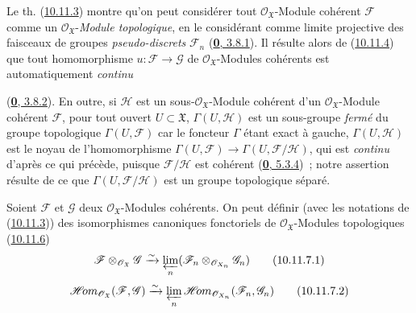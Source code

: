 \begin{env}[10.11.6]
\label{I.10.11.6-fr}
Le th. (\hyperref[I.10.11.3-fr]{10.11.3}) montre qu'on peut considérer
tout $\mathscr{O}_{\mathfrak{X}}$-Module cohérent $\mathscr{F}$ comme
un $\mathscr{O}_{\mathfrak{X}}$-\emph{Module topologique}, en le
considérant comme limite projective des faisceaux de groupes
\emph{pseudo-discrets} $\mathscr{F}_n$
(\hyperref[0.3.8.1-fr]{\textbf{0}, 3.8.1}). Il résulte alors de
(\hyperref[I.10.11.4-fr]{10.11.4}) que tout homomorphisme
$u:\mathscr{F}\to\mathscr{G}$ de
$\mathscr{O}_{\mathfrak{X}}$-Modules cohérents est automatiquement
\emph{continu}


(\hyperref[0.3.8.2-fr]{\textbf{0}, 3.8.2}). En outre, si $\mathscr{H}$ est un
sous-$\mathscr{O}_{\mathfrak{X}}$-Module cohérent d'un
$\mathscr{O}_{\mathfrak{X}}$-Module cohérent $\mathscr{F}$, pour tout
ouvert $U\subset\mathfrak{X}$, $\Gamma(U,\mathscr{H})$ est un sous-groupe
\emph{fermé} du groupe topologique $\Gamma(U,\mathscr{F})$ car le foncteur
$\Gamma$ étant exact à gauche, $\Gamma(U,\mathscr{H})$ est le noyau de
l'homomorphisme
$\Gamma(U,\mathscr{F})\to\Gamma(U,\mathscr{F}/\mathscr{H})$, qui est
\emph{continu} d'après ce qui précède, puisque $\mathscr{F}/\mathscr{H}$
est cohérent (\hyperref[0.5.3.4-fr]{\textbf{0}, 5.3.4})~; notre assertion résulte
de ce que $\Gamma(U,\mathscr{F}/\mathscr{H})$ est un groupe topologique
séparé.
\end{env}

\begin{proposition}[10.11.7]
\label{I.10.11.7-fr}
Soient $\mathscr{F}$ et $\mathscr{G}$ deux
$\mathscr{O}_{\mathfrak{X}}$-Modules cohérents. On peut définir \textup{(avec les
notations de (\hyperref[I.10.11.3-fr]{10.11.3}))} des isomorphismes
canoniques fonctoriels de $\mathscr{O}_{\mathfrak{X}}$-Modules
topologiques \textup{(\hyperref[I.10.11.6-fr]{10.11.6})}
\[
  \label{I.10.11.7.1-fr}
  \mathscr{F}\otimes_{\mathscr{O}_{\mathfrak{X}}}\mathscr{G}
  \xrightarrow{\sim}
  \varprojlim_n
  (\mathscr{F}_n\otimes_{\mathscr{O}_{X_n}}\mathscr{G}_n)
  \tag{10.11.7.1}
\]
\[
  \label{I.10.11.7.2-fr}
  \mathscr{H}\!om_{\mathscr{O}_{\mathfrak{X}}}
  (\mathscr{F},\mathscr{G})
  \xrightarrow{\sim}
  \varprojlim_n
  \mathscr{H}\!om_{\mathscr{O}_{X_n}}(\mathscr{F}_n,\mathscr{G}_n)
  \tag{10.11.7.2}
\]
\end{proposition}


